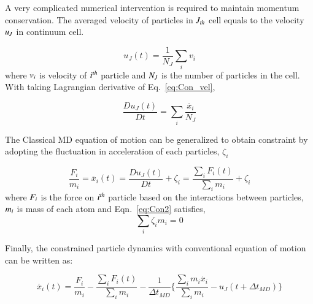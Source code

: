 \documentclass[preprint,12pt]{elsarticle}
\begin{document}
A very complicated numerical intervention is required to maintain momentum conservation. The averaged velocity of particles in $\it J_{th}$ cell equals to the velocity $\it u_{J}$ in continuum cell.

\vspace{-.2em}
\begin{equation}
 u_{J}(t) = \frac{1}{N_{J}} \displaystyle\sum_{i} v_{i}
 \label{eq:Con_vel}
\end{equation}
\normalsize
where $\it v_{i}$ is velocity of $\it i^{th}$ particle and $\it N_{J}$ is the number of particles in the cell. With taking Lagrangian derivative of Eq.~\ref{eq:Con_vel},

\vspace{-.2em}
\begin{equation}
 \frac{Du_{J}(t)}{Dt} =  \displaystyle\sum_{i} \frac{\ddot{x_{i}}}{N_{J}}
 \label{eq:Lagrangian}
\end{equation}
\normalsize

The Classical MD equation of motion can be generalized to obtain constraint by adopting the fluctuation in acceleration of each particles, $\zeta_{i}$

\vspace{-.2em}
\begin{equation}
 \frac{F_{i}}{m_{i}} = \ddot{x_{i}}(t)  =   \frac{Du_{J}(t)}{Dt} + \zeta_{i} = \frac{\displaystyle\sum_{i}F_{i}(t)} {\displaystyle\sum_{i}m_{i}} +   \zeta_{i}
 \label{eq:Con2}
\end{equation}
\normalsize
where $\it F_{i}$ is the force on $\it i^{th}$ particle based on the interactions between particles,  $\it m_{i}$ is mass of each atom and  Eqn.~\ref{eq:Con2} satisfies,
\vspace{-.2em}
\begin{equation}
\displaystyle\sum_{i}\zeta_{i}m_{i} = 0
 \label{eq:Con2}
\end{equation}
\normalsize

Finally, the constrained particle dynamics with conventional equation of motion can be written as:

\vspace{-.2em}
\begin{equation}
 \ddot{x_{i}}(t) = \frac{F_{i}}{m_{i}} -  \frac{\displaystyle\sum_{i}F_{i}(t)} {\displaystyle\sum_{i}m_{i}} - \frac{1}{\Delta t_{MD}} \{  \frac{\displaystyle\sum_{i}m_{i}\dot{x_{i}}} {\displaystyle\sum_{i}m_{i}} - u_{J}(t + \Delta t_{MD})\}
 \label{eq:Con3}
\end{equation}
\normalsize
\end{document}
